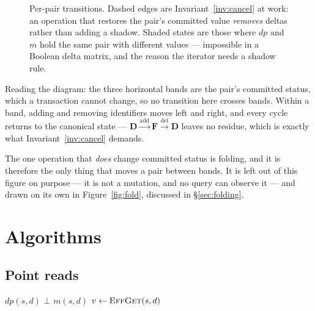 \documentclass[11pt,a4paper]{article}
\theoremstyle{plain}
\theoremstyle{definition}
\theoremstyle{remark}
\newcommand{\M}{\mathsf{M}}
\begin{document}
\begin{figure}[t]
\caption{Per-pair transitions. Dashed edges are
Invariant~\ref{inv:cancel} at work: an operation that restores the pair's
committed value \emph{removes} deltas rather than adding a shadow. Shaded
states are those where $dp$ and $m$ hold the same pair with different values
--- impossible in a Boolean delta matrix, and the reason the iterator needs a
shadow rule.}
\label{fig:automaton}
\end{figure}

Reading the diagram: the three horizontal bands are the pair's committed
status, which a transaction cannot change, so no transition here crosses bands.
Within a band, adding and removing identifiers moves left and right, and every
cycle returns to the canonical state --- $\mathbf{D}
\xrightarrow{\text{add}} \mathbf{F} \xrightarrow{\text{del}} \mathbf{D}$
leaves no residue, which is exactly what Invariant~\ref{inv:cancel} demands.

The one operation that \emph{does} change committed status is folding, and it is
therefore the only thing that moves a pair between bands. It is left out of this
figure on purpose --- it is not a mutation, and no query can observe it --- and
drawn on its own in Figure~\ref{fig:fold}, discussed in \S\ref{sec:folding}.

\section{Algorithms}
\label{sec:algorithms}

\subsection{Point reads}
\label{sec:reads}

\begin{algorithm}[H]
\caption{Effective read and identifier enumeration}
\label{alg:get}
\begin{algorithmic}[1]
  \State {} 
    \State \Return $dp(s,d)$
  \EndIf
    \State \Return $\bot$ 
  \EndIf
  \State \Return $m(s,d)$ 
\EndFunction
\Statex
{} 
  \State $v \gets \Call{EffGet}{s,d}$
  \If{$v = \M$}
    \State \Return {} 
  \Else
    \State \Return {} 
  \EndIf
\EndFunction
\end{algorithmic}
\end{algorithm}
\end{document}
